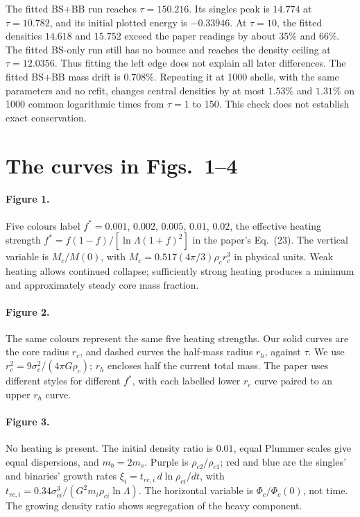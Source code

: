 \documentclass[11pt]{article}
\begin{document}
The fitted BS+BB run reaches $\tau=150.216$. Its singles peak is
$14.774$ at $\tau=10.782$, and its initial plotted energy is $-0.33946$.
At $\tau=10$, the fitted densities $14.618$ and $15.752$ exceed the
paper readings by about $35\%$ and $66\%$. The fitted BS-only run
still has no bounce and reaches the density ceiling at $\tau=12.0356$.
Thus fitting the left edge does not explain all later differences.
The fitted BS+BB mass drift is $0.708\%$. Repeating it at 1000 shells,
with the same parameters and no refit, changes central densities by at
most $1.53\%$ and $1.31\%$ on 1000 common logarithmic times from
$\tau=1$ to 150. This check does not establish exact conservation.

\section{The curves in Figs.~1--4}
\paragraph{Figure 1.}
Five colours label $f^*=0.001$, $0.002$, $0.005$, $0.01$, $0.02$,
the effective heating strength
$f^*=f(1-f)/[\ln\Lambda(1+f)^2]$ in the paper's Eq.~(23).
The vertical variable is $M_c/M(0)$, with
$M_c=0.517(4\pi/3)\rho_cr_c^3$ in physical units.
Weak heating allows continued collapse; sufficiently strong heating
produces a minimum and approximately steady core mass fraction.

\paragraph{Figure 2.}
The same colours represent the same five heating strengths. Our solid
curves are the core radius $r_c$, and dashed curves the half-mass radius
$r_h$, against $\tau$. We use
$r_c^2=9\sigma_c^2/(4\pi G\rho_c)$; $r_h$ encloses half the current
total mass. The paper uses different styles for different $f^*$,
with each labelled lower $r_c$ curve paired to an upper $r_h$ curve.

\paragraph{Figure 3.}
No heating is present. The initial density ratio is $0.01$, equal
Plummer scales give equal dispersions, and $m_b=2m_s$.
Purple is $\rho_{c2}/\rho_{c1}$; red and blue are the singles' and
binaries' growth rates
$\xi_i=t_{rc,i}\,d\ln\rho_{ci}/dt$, with
$t_{rc,i}=0.34\sigma_{ci}^3/(G^2m_i\rho_{ci}\ln\Lambda)$.
The horizontal variable is $\Phi_c/\Phi_c(0)$, not time.
The growing density ratio shows segregation of the heavy component.
\end{document}

